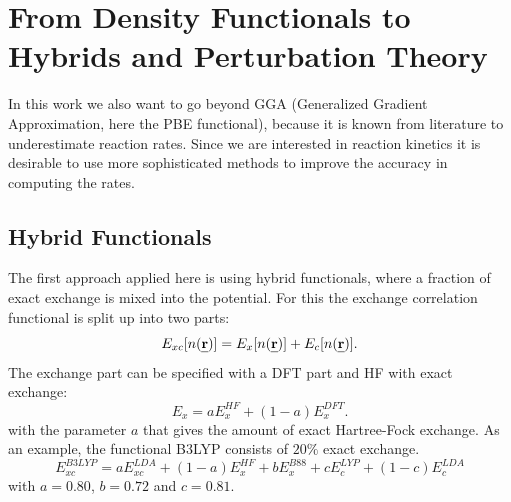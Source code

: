 \documentclass[11pt,DIV=13,BCOR=5mm,a4paper,headinclude]{scrbook}
\def\mathbi#1{\textbf{\em #1}}
\renewcommand{\vec}[1]{\mathbi{#1}}
\begin{document}
\section{From Density Functionals to Hybrids and Perturbation Theory}\label{theorybeyond}
In this work we also want to go beyond GGA (Generalized Gradient Approximation, here the PBE functional), because it is known from literature to underestimate reaction rates\cite{Zhao05}.
Since we are interested in reaction kinetics it is desirable to use more sophisticated methods to improve the accuracy in computing the rates.
\subsection{Hybrid Functionals}
The first approach applied here is using hybrid functionals, where a fraction of exact exchange is mixed into the potential.
For this the exchange correlation functional is split up into two parts:
\begin{equation}
 E_{xc}[n(\vec{r})]=  E_{x}[n(\vec{r})] + E_{c}[n(\vec{r})].
\end{equation}
The exchange part can be specified with a DFT part and HF with exact exchange:
\begin{equation}
 E_x = aE_x^{HF} + (1-a)E_x^{DFT}.
\end{equation}
with the parameter $a$ that gives the amount of exact Hartree-Fock exchange.
As an example, the functional B3LYP consists of $20\%$ exact exchange\cite{Becke1993}.
\begin{equation}
 E_{xc}^{B3LYP}= aE_{xc}^{LDA} + (1-a)E_x^{HF} + bE_x^{B88} + cE_c^{LYP} + (1-c)E_c^{LDA}
\end{equation}
with $a=0.80$, $b=0.72$ and $c=0.81$.
\\
\end{document}
